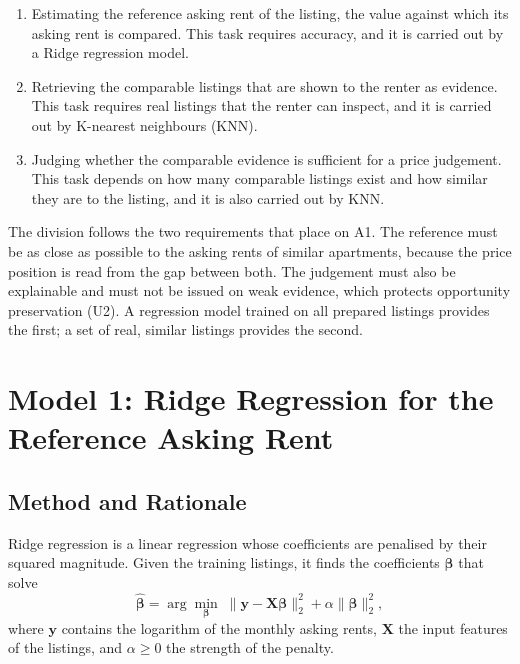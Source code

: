 \documentclass[12pt,a4paper]{report}
\begin{document}
\begin{enumerate}[leftmargin=*]
  \item Estimating the reference asking rent of the listing, the value
  against which its asking rent is compared. This task requires accuracy,
  and it is carried out by a Ridge regression model.
  \item Retrieving the comparable listings that are shown to the renter as
  evidence. This task requires real listings that the renter can inspect,
  and it is carried out by K-nearest neighbours (KNN).
  \item Judging whether the comparable evidence is sufficient for a price
  judgement. This task depends on how many comparable listings exist and how
  similar they are to the listing, and it is also carried out by KNN.
\end{enumerate}

The division follows the two requirements that 
place on A1. The reference must be as close as possible to the asking rents
of similar apartments, because the price position is read from the gap
between both. The judgement must also be explainable and must not be issued
on weak evidence, which protects opportunity preservation (U2). A
regression model trained on all prepared listings provides the first; a set
of real, similar listings provides the second.

\section{Model 1: Ridge Regression for the Reference Asking Rent}
\label{sec:ridge}

\subsection{Method and Rationale}

Ridge regression is a linear regression whose coefficients are penalised
by their squared magnitude. Given the training listings, it finds the
coefficients $\boldsymbol{\beta}$ that solve
\begin{equation}
  \hat{\boldsymbol{\beta}} = \arg\min_{\boldsymbol{\beta}}
  \;\lVert \mathbf{y} - \mathbf{X}\boldsymbol{\beta} \rVert_2^2
  + \alpha \lVert \boldsymbol{\beta} \rVert_2^2,
  \label{eq:ridge}
\end{equation}
where $\mathbf{y}$ contains the logarithm of the monthly asking rents,
$\mathbf{X}$ the input features of the listings, and $\alpha \geq 0$ the
strength of the penalty.
\end{document}
